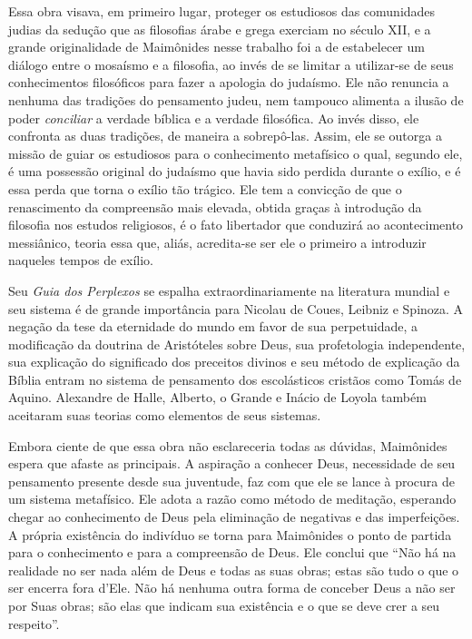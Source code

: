 Essa obra visava, em primeiro lugar, proteger os estudiosos das
comunidades judias da sedução que as filosofias árabe e grega exerciam
no século XII, e a grande originalidade de Maimônides nesse trabalho foi
a de estabelecer um diálogo entre o mosaísmo e a filosofia, ao invés de
se limitar a utilizar-se de seus conhecimentos filosóficos para fazer a
apologia do judaísmo. Ele não renuncia a nenhuma das tradições do
pensamento judeu, nem tampouco alimenta a ilusão de poder \emph{conciliar}
a verdade bíblica e a verdade filosófica. Ao invés disso, ele confronta
as duas tradições, de maneira a sobrepô-las. Assim, ele se outorga a
missão de guiar os estudiosos para o conhecimento metafísico o qual,
segundo ele, é uma possessão original do judaísmo que havia sido perdida
durante o exílio, e é essa perda que torna o exílio tão trágico. Ele tem
a convicção de que o renascimento da compreensão mais elevada, obtida
graças à introdução da filosofia nos estudos religiosos, é o fato
libertador que conduzirá ao acontecimento messiânico, teoria essa que,
aliás, acredita-se ser ele o primeiro a introduzir naqueles tempos de
exílio.

Seu \emph{Guia dos Perplexos} se espalha extraordinariamente na
literatura mundial e seu sistema é de grande importância para Nicolau de
Coues, Leibniz e Spinoza. A negação da tese da eternidade do mundo em
favor de sua perpetuidade, a modificação da doutrina de Aristóteles
sobre Deus, sua profetologia independente, sua explicação do significado
dos preceitos divinos e seu método de explicação da Bíblia entram no
sistema de pensamento dos escolásticos cristãos como Tomás de Aquino.
Alexandre de Halle, Alberto, o Grande e Inácio de Loyola também
aceitaram suas teorias como elementos de seus sistemas.

Embora ciente de que essa obra não esclareceria todas as dúvidas,
Maimônides espera que afaste as principais. A aspiração a conhecer
Deus, necessidade de seu pensamento presente desde sua juventude, faz
com que ele se lance à procura de um sistema metafísico. Ele adota a
razão como método de meditação, esperando chegar ao conhecimento de Deus
pela eliminação de negativas e das imperfeições. A própria existência do
indivíduo se torna para Maimônides o ponto de partida para o
conhecimento e para a compreensão de Deus. Ele conclui que ``Não há na
realidade no ser nada além de Deus e todas as suas obras; estas são
tudo o que o ser encerra fora d'Ele. Não há nenhuma outra forma de
conceber Deus a não ser por Suas obras; são elas que indicam sua
existência e o que se deve crer a seu respeito''.

